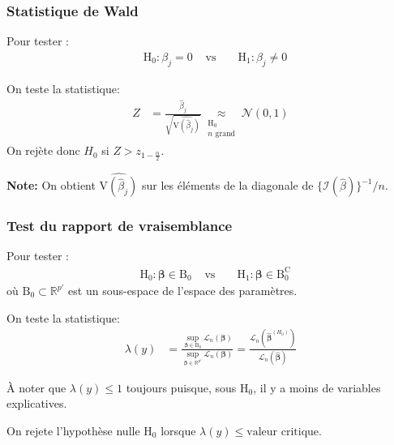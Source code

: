 \documentclass[10pt, french]{article}
\begin{document}
\begin{multicols*}{3}
\subsubsection*{Statistique de Wald}

Pour tester :
\begin{align*}
	&\textrm{H}_{0}: \beta_{j} = 0 &
	\text{ vs } &
	&\textrm{H}_{1}: \beta_{j} \neq 0 
\end{align*} 

On teste la statistique:
\begin{align*}
	Z 
	&= 	\frac{\hat{\beta}_j}{\sqrt{\widehat{\text{V}(\hat{\beta}_j)}}} \underset{\substack{\textrm{H}_0 \\ n \text{ grand} }}{\approx} \mathcal{N}(0,1) 
\end{align*}
On rejète donc $H_0$ si $Z > z_{1 - \frac{\alpha}{2}}$.

\textbf{Note: } On obtient $\widehat{\text{V}(\hat{\beta}_j)}$ sur les éléments de la diagonale de $\{ \mathcal{I}(\hat{\beta}) \}^{-1} / n$.

\subsubsection*{Test du rapport de vraisemblance}

Pour tester :
\begin{align*}
	&\textrm{H}_{0}: \bm{\beta} \in \textrm{B}_{0} &
	\text{ vs } &
	&\textrm{H}_{1}: \bm{\beta} \in \textrm{B}_{0}^{\textrm{C}} 
\end{align*} 
où $\textrm{B}_{0} \subset \mathds{R}^{p'}$ est un sous-espace de l'espace des paramètres.

On teste la statistique:
\begin{align*}
	\lambda(y) 
	&= 	 \frac{\sup_{\bm{\beta} \in \textrm{B}_{0}}\mathcal{L}_n\left(\bm{\beta}\right)}{\sup_{\bm{\beta} \in \mathds{R}^{p'}}\mathcal{L}_n(\bm{\beta})} 
	= 	 \frac{\mathcal{L}_n\left(\bm{\hat{\beta}}^{(H_0)} \right)}{\mathcal{L}_n(\bm{\hat{\beta}})} 
\end{align*}

À noter que $\lambda(y) \leq 1$ toujours puisque, sous $\textrm{H}_0$, il y a moins de variables explicatives. 

On rejete l'hypothèse nulle $\textrm{H}_0$ lorsque $\lambda(y) \leq \text{valeur critique}$.


\end{multicols*}
\end{document}
